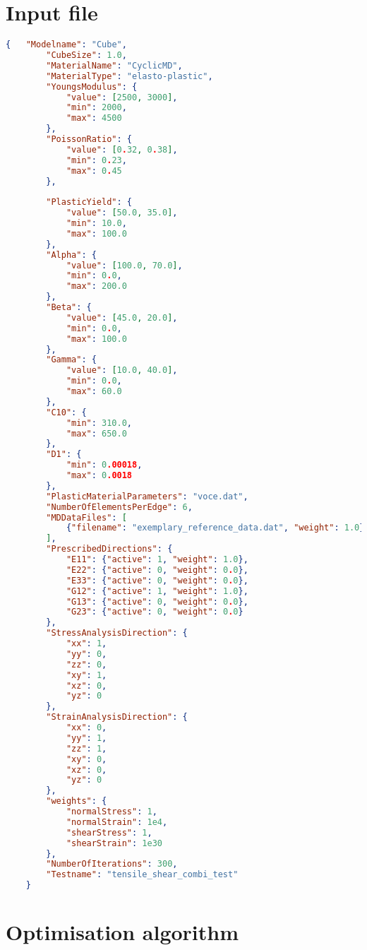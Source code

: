 \begin{appendices}
    \section{Input file} \label{app:inputFile}

    \begin{lstlisting}[language=json,firstnumber=1]
    {   "Modelname": "Cube",
        "CubeSize": 1.0,
        "MaterialName": "CyclicMD",
        "MaterialType": "elasto-plastic",
        "YoungsModulus": {
            "value": [2500, 3000],
            "min": 2000, 
            "max": 4500
        },
        "PoissonRatio": {
            "value": [0.32, 0.38],
            "min": 0.23,
            "max": 0.45
        },
        
        "PlasticYield": {
            "value": [50.0, 35.0],
            "min": 10.0,
            "max": 100.0
        },
        "Alpha": {
            "value": [100.0, 70.0],
            "min": 0.0,
            "max": 200.0
        },
        "Beta": {
            "value": [45.0, 20.0],
            "min": 0.0,
            "max": 100.0
        },
        "Gamma": {
            "value": [10.0, 40.0],
            "min": 0.0,
            "max": 60.0
        },
        "C10": {
            "min": 310.0,
            "max": 650.0
        },
        "D1": {
            "min": 0.00018,
            "max": 0.0018
        },
        "PlasticMaterialParameters": "voce.dat",
        "NumberOfElementsPerEdge": 6,
        "MDDataFiles": [
            {"filename": "exemplary_reference_data.dat", "weight": 1.0}
        ],
        "PrescribedDirections": { 
            "E11": {"active": 1, "weight": 1.0},
            "E22": {"active": 0, "weight": 0.0},
            "E33": {"active": 0, "weight": 0.0},
            "G12": {"active": 1, "weight": 1.0},
            "G13": {"active": 0, "weight": 0.0},
            "G23": {"active": 0, "weight": 0.0}
        },
        "StressAnalysisDirection": {
            "xx": 1,
            "yy": 0,
            "zz": 0,
            "xy": 1,
            "xz": 0,
            "yz": 0
        },
        "StrainAnalysisDirection": {
            "xx": 0,
            "yy": 1,
            "zz": 1,
            "xy": 0,
            "xz": 0,
            "yz": 0
        },
        "weights": {
            "normalStress": 1,
            "normalStrain": 1e4,
            "shearStress": 1,
            "shearStrain": 1e30
        },
        "NumberOfIterations": 300,
        "Testname": "tensile_shear_combi_test"
    }

    \end{lstlisting}
    \newpage
    \section{Optimisation algorithm}\label{app:Script}
    
\end{appendices}